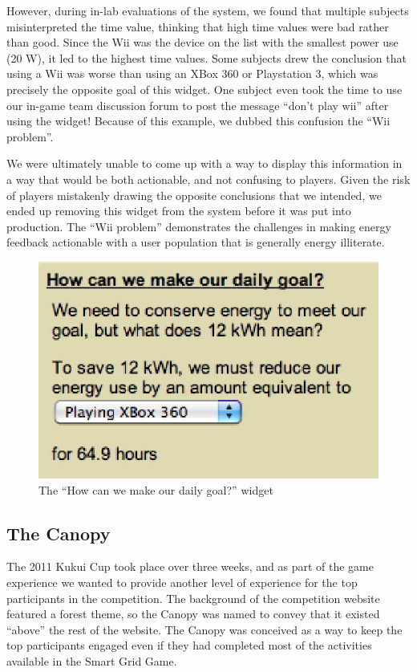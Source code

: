 \documentclass{sigchi}
\begin{document}
However, during in-lab evaluations of the system, we found that multiple subjects misinterpreted the time value, thinking that high time values were bad rather than good. Since the Wii was the device on the list with the smallest power use (20 W), it led to the highest time values. Some subjects drew the conclusion that using a Wii was worse than using an XBox 360 or Playstation 3, which was precisely the opposite goal of this widget. One subject even took the time to use our in-game team discussion forum to post the message ``don't play wii'' after using the widget! Because of this example, we dubbed this confusion the ``Wii problem''.

We were ultimately unable to come up with a way to display this information in a way that would be both actionable, and not confusing to players. Given the risk of players mistakenly drawing the opposite conclusions that we intended, we ended up removing this widget from the system before it was put into production. The ``Wii problem'' demonstrates the challenges in making energy feedback actionable with a user population that is generally energy illiterate.

\begin{figure}[!t]
\centering
\includegraphics[width=0.6\columnwidth]{how-meet-goal.eps}
\caption{The ``How can we make our daily goal?'' widget}
\label{fig:make-goal}
\end{figure}


\subsection{The Canopy}

The 2011 Kukui Cup took place over three weeks, and as part of the game experience we wanted to provide another level of experience for the top participants in the competition. The background of the competition website featured a forest theme, so the Canopy was named to convey that it existed ``above'' the rest of the website. The Canopy was conceived as a way to keep the top participants engaged even if they had completed most of the activities available in the Smart Grid Game.
\end{document}
